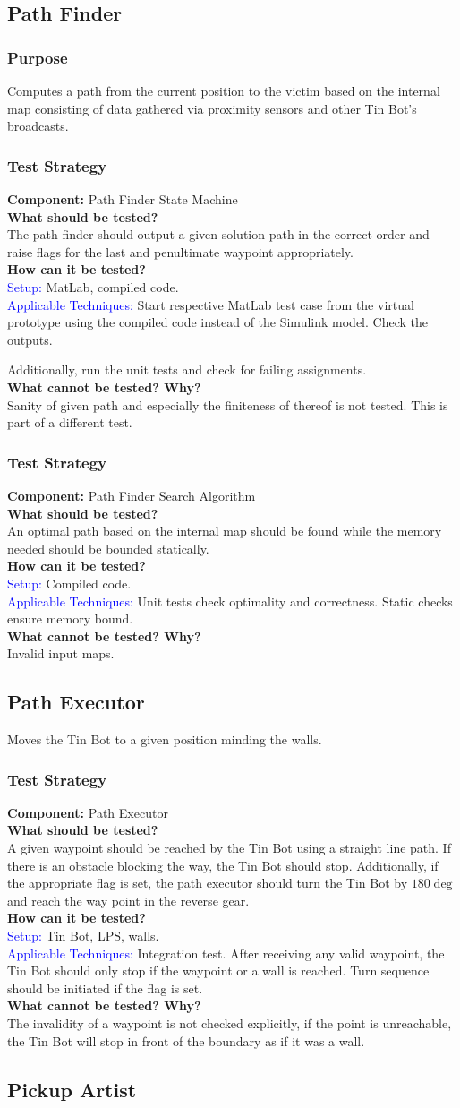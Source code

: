 \documentclass[a4paper,parskip,headheight=38pt]{scrartcl} %
\newcommand{\teststrat}[5]{
    \subsubsection{Test Strategy}
	\textbf{Component:} #1 \\
	\noindent\textbf{What should be tested?} \\
    \noindent #2 \\
	\noindent\textbf{How can it be tested?} \\
    \noindent\textcolor{blue}{Setup:} #3 \\
    \noindent\textcolor{blue}{Applicable Techniques:} #4 \\
	\noindent\textbf{What cannot be tested? Why?} \\
    \noindent #5
}
\begin{document}
\subsection{Path Finder}
\subsubsection{Purpose}
Computes a path from the current position to the victim based on the internal map consisting of data gathered via proximity sensors and other Tin Bot's broadcasts.
\teststrat{Path Finder State Machine}{
    The path finder should output a given solution path in the correct order and
    raise flags for the last and penultimate waypoint appropriately.
}{
    MatLab, compiled code.
}{
    Start respective MatLab test case from the virtual prototype using the
    compiled code instead of the Simulink model. Check the outputs.

    Additionally, run the unit tests and check for failing assignments.
}{
    Sanity of given path and especially the finiteness of thereof is not tested.
    This is part of a different test.
}

\teststrat{Path Finder Search Algorithm}{
    An optimal path based on the internal map should be found while the memory
    needed should be bounded statically.
}{
    Compiled code.
}{
    Unit tests check optimality and correctness. Static checks ensure memory
    bound.
}{
    Invalid input maps.
}

\subsection{Path Executor}
Moves the Tin Bot to a given position minding the walls.
\teststrat{Path Executor}{
    A given waypoint should be reached by the Tin Bot using a straight line
    path. If there is an obstacle blocking the way, the Tin Bot should stop.
    Additionally, if the appropriate flag is set, the path executor should turn
    the Tin Bot by $180\deg$ and reach the way point in the reverse gear.
}{
    Tin Bot, LPS, walls.
}{
    Integration test. After receiving any valid waypoint, the Tin Bot should
    only stop if the waypoint or a wall is reached. Turn sequence should be
    initiated if the flag is set.
}{
    The invalidity of a waypoint is not checked explicitly, if the point is
    unreachable, the Tin Bot will stop in front of the boundary as if it was a
    wall.
}

\subsection{Pickup Artist}
\end{document}

